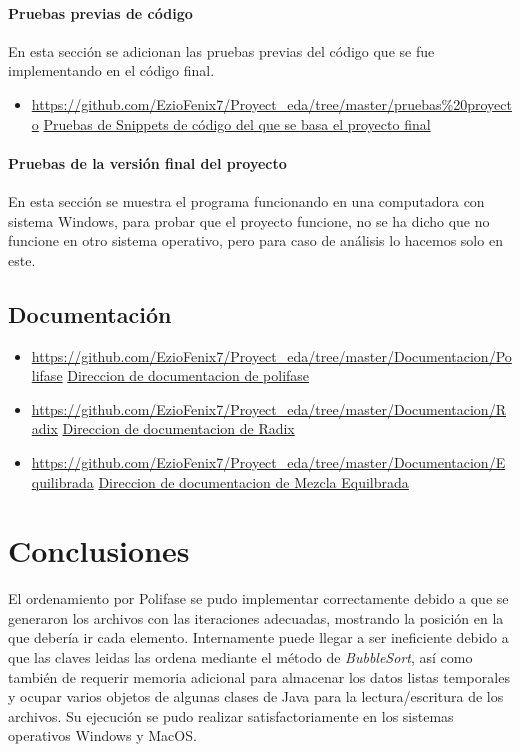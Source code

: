 \documentclass{article}
\begin{document}
		\paragraph*{Pruebas previas de código}
		En esta sección se adicionan las pruebas previas del código que se fue implementando en el código final.
		
			\begin{itemize}
				\item \url{https://github.com/EzioFenix7/Proyect_eda/tree/master/pruebas\%20proyecto}
				\href{https://github.com/EzioFenix7/Proyect_eda/tree/master/pruebas\%20proyecto}{ Pruebas de Snippets de código del que se basa el proyecto final}
			\end{itemize}
		
		\paragraph*{Pruebas de la versión final del proyecto}
		En esta sección se muestra el programa funcionando en una computadora con sistema Windows, para probar que el proyecto funcione, no se ha dicho que no funcione en otro sistema operativo, pero para caso de análisis lo hacemos solo en este.
		
	\subsection{Documentación}
		\begin{itemize}
			\item \url{https://github.com/EzioFenix7/Proyect_eda/tree/master/Documentacion/Polifase}
			\href{https://github.com/EzioFenix7/Proyect_eda/tree/master/Documentacion/Polifase}{Direccion de documentacion de polifase}
			
			\item \url{https://github.com/EzioFenix7/Proyect_eda/tree/master/Documentacion/Radix}
			\href{https://github.com/EzioFenix7/Proyect_eda/tree/master/Documentacion/Radix}{Direccion de documentacion de Radix}
			
			\item 	\url{https://github.com/EzioFenix7/Proyect_eda/tree/master/Documentacion/Equilibrada}
			\href{https://github.com/EzioFenix7/Proyect_eda/tree/master/Documentacion/Equilibrada}{Direccion de documentacion de Mezcla Equilbrada}
		\end{itemize}

	\section{Conclusiones}
	El ordenamiento por Polifase se pudo implementar correctamente debido a que se generaron los archivos con las iteraciones adecuadas, mostrando la posición en la que debería ir cada elemento.
	Internamente puede llegar a ser ineficiente debido a que las claves leidas las ordena mediante el método de \textit{BubbleSort}, así como también de requerir memoria adicional para almacenar
	los datos listas temporales y ocupar varios objetos de algunas clases de Java para la lectura/escritura de los archivos. Su ejecución se pudo realizar satisfactoriamente en los sistemas operativos
	Windows y MacOS.\\
	
\end{document}
